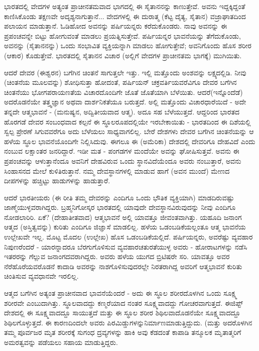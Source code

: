 ಭಾರತದಲ್ಲಿ ವೇದಗಳ ಅತ್ಯಂತ ಪ್ರಾಚೀನತಮವಾದ ಭಾಗದಲ್ಲಿ ಈ ಸೈತಾನನನ್ನು ಕಾಣುತ್ತೇವೆ. ಅವನು ಇದ್ದಕ್ಕಿದ್ದಂತೆ ಕಾಣಿಸಿಕೊಂಡು ತಕ್ಷಣವೇ ಅದೃಶ್ಯನಾಗುತ್ತಾನೆ... ವೇದಗಳಲ್ಲಿ ಈ ದುರಾತ್ಮ (ಕೆಟ್ಟ ದೈತ್ಯ, ಸೈತಾನ) ವಜ್ರಾಘಾತದಿಂದ ಪಲಾಯನ ಮಾಡುತ್ತಾನೆ. ಓಡಿಹೋದ ಅವನನ್ನು ಪರ್ಷಿಯನ್ನರು ಕರೆದುಕೊಂಡರು. ನಾವು ಅವನನ್ನು ಈ ಪ್ರಪಂಚವನ್ನೇ ಬಿಟ್ಟು ಹೋಗುವಂತೆ ಮಾಡಲು ಪ್ರಯತ್ನಿಸುತ್ತೇವೆ. ಪರ್ಷಿಯನ್ನರ ಭಾವನೆಯನ್ನು ತೆಗೆದುಕೊಂಡು, ಅವನನ್ನು (ಸೈತಾನನನ್ನು) ಒಂದು ಸಂಭಾವಿತ ವ್ಯಕ್ತಿಯನ್ನಾಗಿ ಮಾಡಲು ಹೋಗುತ್ತೇವೆ; ಅವನಿಗೊಂದು ಹೊಸ ಶರೀರ (ಆಕಾರ) ಕೊಡುತ್ತೇವೆ. ಭಾರತದಲ್ಲಿ ಸೈತಾನನ ವಿಚಾರ (ಅಲ್ಲಿಗೆ ವೇದಗಳ ಪ್ರಾಚೀನತಮ ಭಾಗಕ್ಕೆ) ಮುಗಿಯಿತು.

ಆದರೆ ದೇವರ (ಈಶ್ವರನ) ಬಗೆಗಿನ ಚಿಂತನೆ ಸಾಗುತ್ತಲೇ ಇತ್ತು. ಇಲ್ಲಿ ಮತ್ತೊಂದು ಅಂಶವನ್ನು ಲಕ್ಷ್ಯದಲ್ಲಿಡಿ. ನೀವು (ಚಿಂತನೆಯ ಮೂಲವನ್ನು) ಶೋಧಿಸುತ್ತಾ ಹೋದಂತೆ, ಪರ್ಷಿಯನ್ ಚಕ್ರವರ್ತಿಯವರೆವಿಗೂ ದೇವರ ಬಗೆಗಿನ ಚಿಂತನೆಯು ಭೋಗ\break ಪರಾಯಣತೆಯ ವಿಚಾರದೊಂದಿಗೇ ಜೊತೆ ಜೊತೆಯಾಗಿ ಬೆಳೆಯಿತು. ಆದರೆ\break (ಇನ್ನೊಂದೆಡೆ) ಅದರೊಡನೆಯೇ ತತ್ತ್ವಜ್ಞಾನ ಅಥವಾ ದಾರ್ಶನಿಕತೆಯೂ ಬರುತ್ತದೆ. ಅಲ್ಲಿ ಮತ್ತೊಂದು ವಿಚಾರಧಾರೆಯಿದೆ - ಅದೇ ತನ್ನದೇ ಆತ್ಮಭಾವನೆ - (ಮನುಷ್ಯನ, ಅದ್ವಿತೀಯವಾದ ಆತ್ಮ). ಅದೂ ಸಹ ಬೆಳೆಯುತ್ತದೆ. ಆದ್ದರಿಂದ ಭಾರತದ ಹೊರಗಡೆ ದೇವರ ಸಂಬಂಧವಾದ ಕಲ್ಪನೆ ಈ ಸ್ಥೂಲರೂಪದಲ್ಲಿಯೇ ಇರಬೇಕಾಯಿತು - ಭಾರತದಿಂದ ಈ ದಿಶೆಯಲ್ಲಿ ಸ್ವಲ್ಪ ಪ್ರೇರಣೆ ಸಿಗುವವರೆಗೂ ಅದು ಬೆಳೆಯಲು ಸಾಧ್ಯವಾಗಲಿಲ್ಲ. ಬೇರೆ ದೇಶಗಳು ದೇವರ ಬಗೆಗಿನ ಚಿಂತನೆಯನ್ನು ಆ ಹಳೆಯ ಸ್ಥೂಲ ಭಾವನೆಯೊಂದಿಗೇ ನಿಲ್ಲಿಸಿದುವು. ಈಗಲೂ ಈ (ಅಮೆರಿಕಾ) ದೇಶದಲ್ಲಿ ದೇವರಿಗೂ ದೇಹವಿದೆ ಎಂದು ನಂಬುವ ಲಕ್ಷಾಂತರ ಜನರಿದ್ದಾರೆ. ಇಡೀ ಮತ - ಪಂಗಡಗಳ ಮಂದೆಯೇ ಅವನ್ನು ಘೋಷಿಸುತ್ತವೆ. ಅವನು ಈ ಪ್ರಪಂಚವನ್ನು ಆಳುತ್ತಾನೆಂದೂ ಅವನಿಗೆ ದೇಹವಿರುವ ಒಂದು ಸ್ಥಾನವಿದೆಯೆಂದೂ ಅವರು ನಂಬುತ್ತಾರೆ, ಅವನು ಸಿಂಹಾಸನದ ಮೇಲೆ ಕುಳಿತಿರುತ್ತಾನೆ. ನಮ್ಮ ದೇವಸ್ಥಾನಗಳಲ್ಲಿ ಮಾಡುವ ಹಾಗೆ (ಅವನ ಮುಂದೆ) ಮೇಣದ ದೀಪಗಳನ್ನು ಹಚ್ಚಿಟ್ಟು ಹಾಡುಗಳನ್ನು ಹಾಡುತ್ತಾರೆ.

ಆದರೆ ಭಾರತೀಯರು (ಈ ರೀತಿ ತಮ್ಮ ದೇವರನ್ನು ಎಂದಿಗೂ ಒಂದು ಭೌತಿಕ ವ್ಯಕ್ತಿಯಾಗಿ) ಮಾಡದಿರುವಷ್ಟು ಜಾಣ್ಮೆಯುಳ್ಳವರಾಗಿದ್ದರು. ಬ್ರಹ್ಮನಿಗೋಸ್ಕರ ಭಾರತದಲ್ಲಿ ಯಾವುದೇ ದೇವಸ್ಥಾನವಿರುವುದನ್ನು ನೀವು ಎಂದಿಗೂ ನೋಡಲಾರಿರಿ. ಏಕೆ? (ದೇಹಾತೀತವಾದ) ಆತ್ಮಭಾವನೆ ಅಲ್ಲಿ ಯಾವತ್ತೂ ಜೀವಂತವಾಗಿತ್ತು. ಯಹೂದಿ ಜನಾಂಗ ಆತ್ಮದ (ಅಸ್ತಿತ್ವವನ್ನು) ಕುರಿತು ಎಂದಿಗೂ ಜಿಜ್ಞಾಸೆ ಮಾಡಲಿಲ್ಲ. ಹಳೆಯ ಒಡಂಬಡಿಕೆಯಲ್ಲಂತೂ ಆತ್ಮ ಭಾವನೆಯ ಉಲ್ಲೇಖವೇ ಇಲ್ಲ. ಮೊಟ್ಟ ಮೊದಲ (ಉಲ್ಲೇಖ) ಹೊಸ ಒಡಂಬಡಿಕೆಯಲ್ಲಿದೆ. ಪರ್ಷಿಯನ್ನರು, ಅವರೆಷ್ಟು ವ್ಯವಹಾರ ನಿಪುಣರೆಂದರೆ - ಯಾರನ್ನಾದರೂ ಬೆರಗುಗೊಳಿಸುವ ವ್ಯವಹಾರಚತುರತೆಯುಳ್ಳ ಅವರು - ಹೋರಾಟಗಳನ್ನು ನಡೆಸಿ ಇತರರನ್ನು ಗೆಲ್ಲುವ ಜನಾಂಗದವರಾಗಿದ್ದರು. ಅವರು ಹಳೆಯ ಯುಗದ ಬ್ರಿಟಿಷರೇ ಸರಿ. ಯಾವತ್ತೂ ಅವರ ನೆರೆಹೊರೆಯವರೊಡನೆ ಕಾದಾಡಿ ಅವರನ್ನು ನಾಶಗೊಳಿಸುವುದರಲ್ಲೇ ನಿರತರಾಗಿದ್ದ ಅವರಿಗೆ ಆತ್ಮಭಾವನೆ ಕುರಿತು ಚಿಂತಿಸುವ ವ್ಯವಧಾನವೇ ಇರಲಿಲ್ಲ.

ಆತ್ಮದ ಬಗೆಗಿನ ಅತ್ಯಂತ ಪ್ರಾಚೀನವಾದ ಭಾವನೆಯೆಂದರೆ - ಅದು ಈ ಸ್ಥೂಲ ಶರೀರದೊಳಗಿನ ಒಂದು ಸೂಕ್ಷ್ಮ ಶರೀರವೇ ಎಂಬುದಾಗಿತ್ತು. ಸ್ಥೂಲವಾದದ್ದು ಕಣ್ಮರೆಯಾದ ನಂತರ ಸೂಕ್ಷ್ಮವಾದದ್ದು ಗೋಚರವಾಗುತ್ತದೆ. ಈಜಿಪ್ಟ್ ದೇಶದಲ್ಲಿ ಈ ಸೂಕ್ಷ್ಮವಾದದ್ದೂ ಸಾಯುತ್ತದೆ ಮತ್ತು ಈ ಸ್ಥೂಲ ಶರೀರ ಶಿಥಿಲವಾದೊಡನೆಯೇ ಸೂಕ್ಷ್ಮವಾದದ್ದೂ ಶಿಥಿಲಗೊಳ್ಳುತ್ತದೆ. ಈ ಕಾರಣದಿಂದಲೇ ಅವರು ಪಿರಮಿಡ್ಡುಗಳನ್ನು\break ನಿರ್ಮಾಣಮಾಡುತ್ತಿದ್ದುದು. (ಮತ್ತು ಅದರೊಳಗಿನ ತಮ್ಮ ಪೂರ್ವಜರ ಮೃತ ಶರೀರಕ್ಕೆ ಸುಗಂಧ ದ್ರವ್ಯಗಳನ್ನು ಹಾಕಿ ಅವು ಕೆಡದಂತೆ ಕಾಪಾಡಿ ತನ್ಮೂಲಕ ಮೃತಾತ್ಮರಿಗೆ ಅಮರತ್ವವನ್ನು ಪಡೆಯಲು ಸಹಾಯ ಮಾಡುತ್ತಿದ್ದರು.


